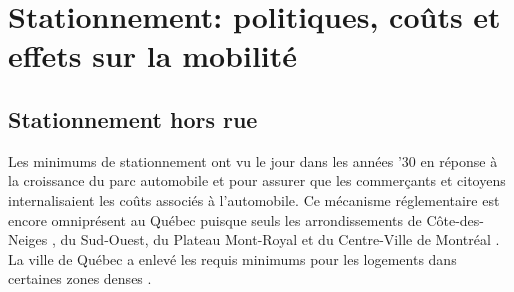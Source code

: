 \section{Stationnement: politiques, coûts et effets sur la mobilité}
  \subsection{Stationnement hors rue}
   Les minimums de stationnement ont vu le jour dans les années '30 \parencite{shoup_high_2005}en réponse à la croissance du parc automobile et pour assurer que les commerçants et citoyens internalisaient les coûts associés à l'automobile. Ce mécanisme réglementaire est encore omniprésent au Québec puisque seuls les arrondissements de Côte-des-Neiges , du Sud-Ouest, du Plateau Mont-Royal et du Centre-Ville de Montréal \parencite{arrondissement_cote-des-neiges_ville_de_montreal_reglement_2020,arrondissement_sud-ouest_ville_de_montreal_reglement_2020,arrondissement_ville-marie_ville_de_montreal_reglement_2018,arrondissement_plateau_mont-royal_ville_de_montreal_reglement_2015}. La ville de Québec a enlevé les requis minimums pour les logements dans certaines zones denses \parencite{ville_de_quebec_adoption_2024}.
